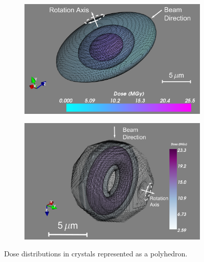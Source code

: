         \begin{figure}
            \centering
            \begin{subfigure}[b]{0.463\textwidth}
                    \centering
                    \includegraphics[width=\textwidth]{figures/introduction/ellipsoidcrystal.pdf}
                    \caption{}
                    \label{fig:Ellipsoidal crystal}
            \end{subfigure}
            \quad
            \begin{subfigure}[b]{0.437\textwidth}
                    \centering
                    \includegraphics[width=\textwidth]{figures/introduction/IcoCrystalEdges.pdf}
                    \caption{}
                    \label{fig:Icosohedral crystal}
            \end{subfigure}
            \caption[Dose distributions in crystals represented as a polyhedron]{Dose distributions in crystals represented as a polyhedron.
}
\end{figure}
